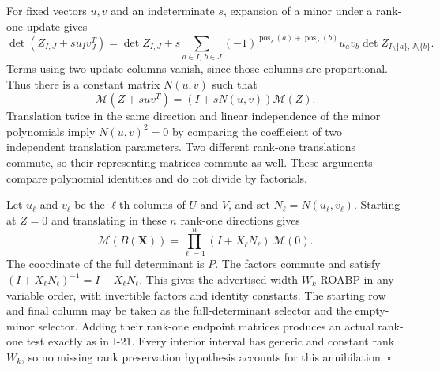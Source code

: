 For fixed vectors $u,v$ and an indeterminate $s$, expansion
of a minor under a rank-one update gives
\[
 \det(Z_{I,J}+s u_Iv_J^T)
 =\det Z_{I,J}
  +s\sum_{a\in I,\ b\in J}
        (-1)^{\operatorname{pos}_I(a)+\operatorname{pos}_J(b)}
        u_av_b\det Z_{I\setminus\{a\},J\setminus\{b\}}.
\]
Terms using two update columns vanish, since those columns are
proportional.  Thus there is a constant matrix $N(u,v)$ such that
\[
 \mathcal M(Z+suv^T)=(I+sN(u,v))\mathcal M(Z).
\]
Translation twice in the same direction and linear independence
of the minor polynomials imply $N(u,v)^2=0$ by comparing the
coefficient of two independent translation parameters.  Two
different rank-one translations commute, so their representing
matrices commute as well.  These arguments compare polynomial
identities and do not divide by factorials.

Let $u_\ell$ and $v_\ell$ be the $\ell$th columns of $U$ and
$V$, and set $N_\ell=N(u_\ell,v_\ell)$.  Starting at $Z=0$
and translating in these $n$ rank-one directions gives
\[
 \mathcal M(B(\mathbf X))
     =\prod_{\ell=1}^n(I+X_\ell N_\ell)\,\mathcal M(0).
\]
The coordinate of the full determinant is $P$.  The factors
commute and satisfy
$(I+X_\ell N_\ell)^{-1}=I-X_\ell N_\ell$.
This gives the advertised width-$W_k$ ROABP in any variable
order, with invertible factors and identity constants.
The starting row and final column may be taken as the
full-determinant selector and the empty-minor selector.
Adding their rank-one endpoint matrices produces an actual
rank-one test exactly as in I-21.  Every interior interval
has generic and constant rank $W_k$, so no missing rank
preservation hypothesis accounts for this annihilation.
\hfill$\square$

